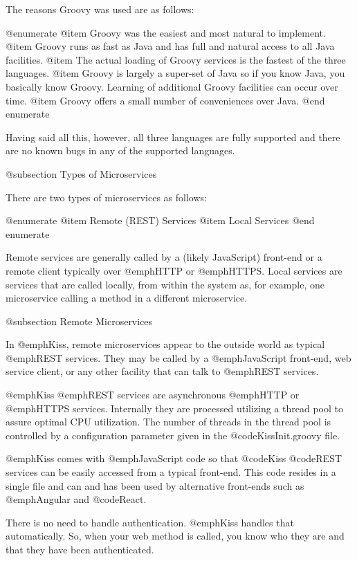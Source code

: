 The reasons Groovy was used are as follows:

@enumerate
@item
Groovy was the easiest and most natural to implement.
@item
Groovy runs as fast as Java and has full and natural access to all 
Java facilities.
@item
The actual loading of Groovy services is the fastest of the three languages.
@item
Groovy is largely a super-set of Java so if you know Java, you basically
know Groovy.  Learning of additional Groovy facilities can occur over
time.
@item
Groovy offers a small number of conveniences over Java.
@end enumerate

Having said all this, however, all three languages are fully supported
and there are no known bugs in any of the supported languages.

@subsection Types of Microservices

There are two types of microservices as follows:

@enumerate
@item
Remote (REST) Services
@item
Local Services
@end enumerate

Remote services are generally called by a (likely JavaScript)
front-end or a remote client typically over @emph{HTTP} or
@emph{HTTPS}.  Local services are services that are called locally,
from within the system as, for example, one microservice calling a
method in a different microservice.

@subsection Remote Microservices

In @emph{Kiss}, remote microservices appear to the outside world as
typical @emph{REST} services.  They may be called by a
@emph{JavaScript} front-end, web service client, or any other facility
that can talk to @emph{REST} services.

@emph{Kiss} @emph{REST} services are asynchronous @emph{HTTP} or
@emph{HTTPS} services.  Internally they are processed utilizing a
thread pool to assure optimal CPU utilization.  The number of threads
in the thread pool is controlled by a configuration parameter given in
the @code{KissInit.groovy} file.

@emph{Kiss} comes with @emph{JavaScript} code so that @code{Kiss}
@code{REST} services can be easily accessed from a typical front-end.
This code resides in a single file and can and has been used by
alternative front-ends such as @emph{Angular} and @code{React}.

There is no need to handle authentication.  @emph{Kiss} handles that
automatically.  So, when your web method is called, you know who
they are and that they have been authenticated.

